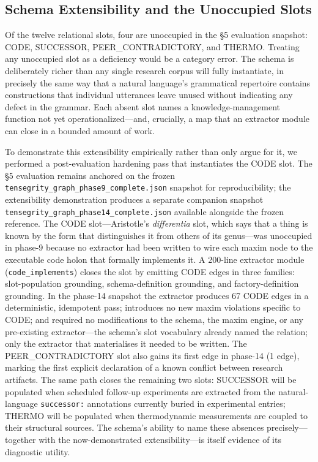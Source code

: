\documentclass{iosart2x}
\begin{document}
\subsection{Schema Extensibility and the Unoccupied Slots}

Of the twelve relational slots, four are unoccupied in the §5 evaluation snapshot: CODE, SUCCESSOR, PEER\_CONTRADICTORY, and THERMO. Treating any unoccupied slot as a deficiency would be a category error. The schema is deliberately richer than any single research corpus will fully instantiate, in precisely the same way that a natural language's grammatical repertoire contains constructions that individual utterances leave unused without indicating any defect in the grammar. Each absent slot names a knowledge-management function not yet operationalized---and, crucially, a map that an extractor module can close in a bounded amount of work.

To demonstrate this extensibility empirically rather than only argue for it, we performed a post-evaluation hardening pass that instantiates the CODE slot. The §5 evaluation remains anchored on the frozen \texttt{tensegrity\_graph\_phase9\_complete.json} snapshot for reproducibility; the extensibility demonstration produces a separate companion snapshot \texttt{tensegrity\_graph\_phase14\_complete.json} available alongside the frozen reference. The CODE slot---Aristotle's \emph{differentia} slot, which says that a thing is known by the form that distinguishes it from others of its genus---was unoccupied in phase-9 because no extractor had been written to wire each maxim node to the executable code holon that formally implements it. A 200-line extractor module (\texttt{code\_implements}) closes the slot by emitting CODE edges in three families: slot-population grounding, schema-definition grounding, and factory-definition grounding. In the phase-14 snapshot the extractor produces 67 CODE edges in a deterministic, idempotent pass; introduces no new maxim violations specific to CODE; and required no modifications to the schema, the maxim engine, or any pre-existing extractor---the schema's slot vocabulary already named the relation; only the extractor that materialises it needed to be written. The PEER\_CONTRADICTORY slot also gains its first edge in phase-14 (1 edge), marking the first explicit declaration of a known conflict between research artifacts. The same path closes the remaining two slots: SUCCESSOR will be populated when scheduled follow-up experiments are extracted from the natural-language \texttt{successor:} annotations currently buried in experimental entries; THERMO will be populated when thermodynamic measurements are coupled to their structural sources. The schema's ability to name these absences precisely---together with the now-demonstrated extensibility---is itself evidence of its diagnostic utility.
\end{document}
